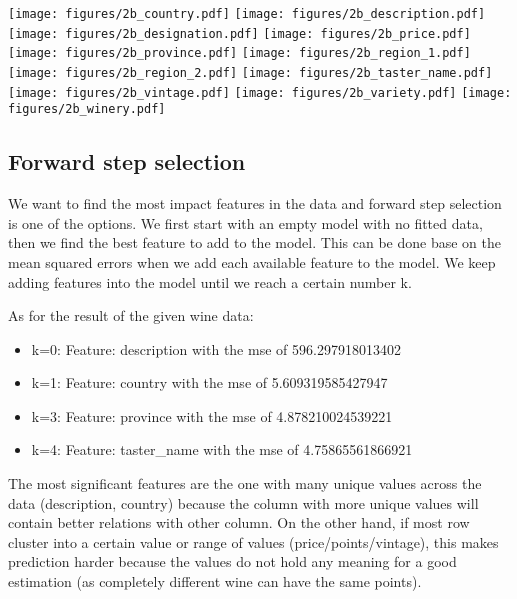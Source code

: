 \documentclass[11pt]{article}
\begin{document}
\texttt{[image: figures/2b\_country.pdf]}
\texttt{[image: figures/2b\_description.pdf]}
\texttt{[image: figures/2b\_designation.pdf]}
\texttt{[image: figures/2b\_price.pdf]}
\texttt{[image: figures/2b\_province.pdf]}
\texttt{[image: figures/2b\_region\_1.pdf]}
\texttt{[image: figures/2b\_region\_2.pdf]}
\texttt{[image: figures/2b\_taster\_name.pdf]}
\texttt{[image: figures/2b\_vintage.pdf]}
\texttt{[image: figures/2b\_variety.pdf]}
\texttt{[image: figures/2b\_winery.pdf]}


\subsection{Forward step selection}
We want to find the most impact features in the data and forward step selection is one of the options. We first start with an empty model with no fitted data, then we find the best feature to add to the model. This can be done base on the mean squared errors when we add each available feature to the model. We keep adding features into the model until we reach a certain number k.

As for the result of the given wine data:
\begin{itemize}
    \item k=0: Feature: description with the mse of 596.297918013402
    \item k=1: Feature: country with the mse of 5.609319585427947
    \item k=3: Feature: province with the mse of 4.878210024539221
    \item k=4: Feature: taster\_name with the mse of 4.75865561866921
\end{itemize}

The most significant features are the one with many unique values across the data (description, country) because the column with more unique values will contain better relations with other column. On the other hand, if most row cluster into a certain value or range of values (price/points/vintage), this makes prediction harder because the values do not hold any meaning for a good estimation (as completely different wine can have the same points).

\end{document}
